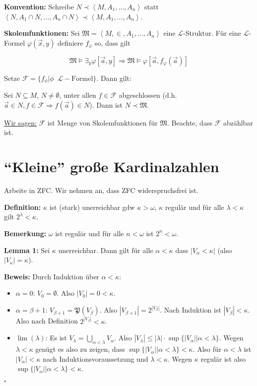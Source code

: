 \documentclass[a4paper,fontsize=11pt]{scrartcl}
\begin{document}
{\bf Konvention:} Schreibe $N\prec\left<M,A_1,\ldots,A_n\right>$ statt
$\left<N,A_1\cap N,\ldots,A_n\cap
N\right>\prec\left<M,A_1,\ldots,A_n\right>$.

{\bf Skolemfunktionen:} Sei
$\mathfrak{M}=\left<M,\in,A_1,\ldots,A_n\right>$ eine
${\mathcal{L}}$-Struktur. Für eine $\mathcal{L}$-Formel
$\varphi(\vec{x},y)$ definiere $f_\varphi$ so, dass gilt

$$ \mathfrak{M}\models \exists_y \varphi[\vec{a},y] \Rightarrow
\mathfrak{M}\models\varphi[\vec{a},f_\varphi(\vec{a})]$$

Setze
$\mathcal{F}=\{f_\phi|\phi\phantom{a}\mathcal{L}-\mbox{Formel}\}$. Dann
gilt:

Sei $N\subseteq M$, $N\neq\emptyset$, unter allen $f\in\mathcal{F}$
abgeschlossen (d.h. $\vec{a}\in N,f\in\mathcal{F}\Rightarrow
f(\vec{a})\in N$). Dann ist $N\prec\mathfrak{M}$.

\underline{Wir sagen:} $\mathcal{F}$ ist Menge von Skolemfunktionen
für $\mathfrak{M}$. Beachte, dass $\mathcal{F}$ abzählbar ist.

\section{``Kleine'' große Kardinalzahlen}
Arbeite in ZFC. Wir nehmen an, dass ZFC widerspruchsfrei ist.

{\bf Definition:} $\kappa$ ist (stark) unerreichbar gdw
$\kappa>\omega$, $\kappa$ regulär und für alle $\lambda<\kappa$ gilt
$2^\lambda<\kappa$.

{\bf Bemerkung:} $\omega$ ist regulär und für alle $n<\omega$ ist
$2^n<\omega$.

{\bf Lemma 1:} Sei $\kappa$ unerreichbar. Dann gilt für alle
$\alpha<\kappa$ dass $|V_\alpha<\kappa|$ (also $|V_\kappa|=\kappa$).

{\bf Beweis:} Durch Induktion über $\alpha<\kappa$:
\begin{itemize}
  \item $\alpha=0$: $V_0=\emptyset$. Also $|V_0|=0<\kappa$.
  \item $\alpha=\beta+1$: $V_{\beta+1}=\mathfrak{P}(V_\beta)$. Also
    $|V_{\beta+1}|=2^{|V_\beta|}$. Nach Induktion ist
    $|V_\beta|<\kappa$. Also nach Definition $2^{|V_\beta|}<\kappa$.
  \item $\lim(\lambda)$: Es ist
    $V_\lambda=\bigcup\limits_{\alpha<\lambda} V_\alpha$. Also
    $|V_\lambda|\le |\lambda|\cdot
    \sup\{|V_\alpha||\alpha<\lambda\}$. Wegen $\lambda<\kappa$ genügt
    es also zu zeigen, dass
    $\sup\{|V_\alpha||\alpha<\lambda\}<\kappa$. Also für
    $\alpha<\lambda$ ist $|V_\alpha|<\kappa$ nach
    Induktionsvoraussetzung und $\lambda<\kappa$. Wegen $\kappa$
    regulär ist also $\sup\{|V_\alpha||\alpha<\lambda\}<\kappa$.
\end{itemize}
\hfill $\square$
\end{document}
